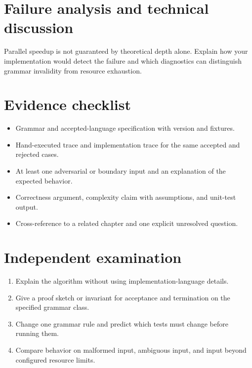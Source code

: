 \documentclass[11pt,letterpaper]{article}
\begin{document}
\section{Failure analysis and technical discussion}
Parallel speedup is not guaranteed by theoretical depth alone. Explain how your implementation would detect the failure and which diagnostics can distinguish grammar invalidity from resource exhaustion.
\section{Evidence checklist}
\begin{itemize}
\item Grammar and accepted-language specification with version and fixtures.
\item Hand-executed trace and implementation trace for the same accepted and rejected cases.
\item At least one adversarial or boundary input and an explanation of the expected behavior.
\item Correctness argument, complexity claim with assumptions, and unit-test output.
\item Cross-reference to a related chapter and one explicit unresolved question.
\end{itemize}
\section{Independent examination}
\begin{enumerate}
\item Explain the algorithm without using implementation-language details.
\item Give a proof sketch or invariant for acceptance and termination on the specified grammar class.
\item Change one grammar rule and predict which tests must change before running them.
\item Compare behavior on malformed input, ambiguous input, and input beyond configured resource limits.
\end{enumerate}
\end{document}
